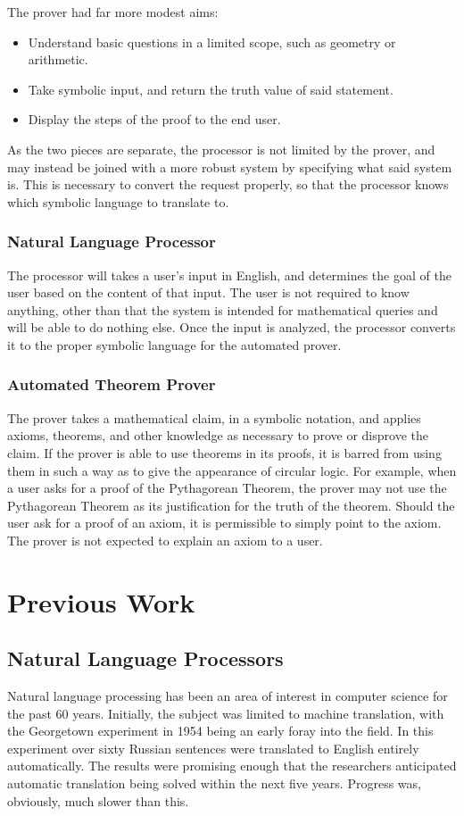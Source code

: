\documentclass[12pt]{article}
\begin{document}
The prover had far more modest aims:
\begin{itemize}
\item{Understand basic questions in a limited scope, such as geometry or arithmetic.}
\item{Take symbolic input, and return the truth value of said statement.}
\item{Display the steps of the proof to the end user.}
\end{itemize}

As the two pieces are separate, the processor is not limited by the prover, and may instead be joined with a more robust system by specifying what said system is. This is necessary to convert the request properly, so that the processor knows which symbolic language to translate to.
\subsubsection{Natural Language Processor}
The processor will takes a user's input in English, and determines the goal of the user based on the content of that input. The user is not required to know anything, other than that the system is intended for mathematical queries and will be able to do nothing else. Once the input is analyzed, the processor converts it to the proper symbolic language for the automated prover.
\subsubsection{Automated Theorem Prover}

The prover takes a mathematical claim, in a symbolic notation, and applies axioms, theorems, and other knowledge as necessary to prove or disprove the claim. If the prover is able to use theorems in its proofs, it is barred from using them in such a way as to give the appearance of circular logic. For example, when a user asks for a proof of the Pythagorean Theorem, the prover may not use the Pythagorean Theorem as its justification for the truth of the theorem. %
Should the user ask for a proof of an axiom, it is permissible to simply point to the axiom. The prover is not expected to explain an axiom to a user.


\section{Previous Work}
\subsection{Natural Language Processors}
Natural language processing has been an area of interest in computer science for the past 60 years. Initially, the subject was limited to machine translation, with the Georgetown experiment in 1954 being an early foray into the field. In this experiment over sixty Russian sentences were translated to English entirely automatically. The results were promising enough that the researchers anticipated automatic translation being solved within the next five years. \cite{Hutchins} Progress was, obviously, much slower than this.
\end{document}
